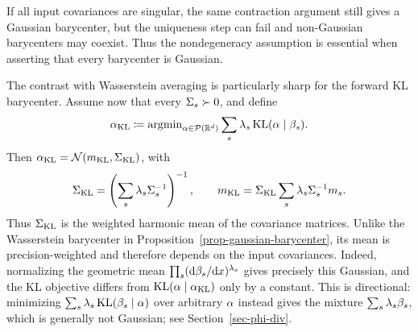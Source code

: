 If all input covariances are singular, the same contraction argument still gives a Gaussian barycenter, but the uniqueness step can fail and non-Gaussian barycenters may coexist. Thus the nondegeneracy assumption is essential when asserting that every barycenter is Gaussian.

\begin{rem}
	The contrast with Wasserstein averaging is particularly sharp for the forward KL barycenter. Assume now that every \(\Sigma_s\succ0\), and define
	\[
		\alpha_{\mathrm{KL}}
		\coloneqq
		\operatorname{argmin}_{\alpha\in\mathcal{P}(\mathbb{R}^d)}
		\sum_s\lambda_s\operatorname{KL}(\alpha\mid\beta_s).
	\]
	Then \(\alpha_{\mathrm{KL}}=\mathcal{N}(m_{\mathrm{KL}},\Sigma_{\mathrm{KL}})\), with
	\[
		\Sigma_{\mathrm{KL}}
		=
		\left(\sum_s\lambda_s\Sigma_s^{-1}\right)^{-1},
		\qquad
		m_{\mathrm{KL}}
		=
		\Sigma_{\mathrm{KL}}
		\sum_s\lambda_s\Sigma_s^{-1}m_s.
	\]
	Thus \(\Sigma_{\mathrm{KL}}\) is the weighted harmonic mean of the covariance matrices. Unlike the Wasserstein barycenter in Proposition~\ref{prop-gaussian-barycenter}, its mean is precision-weighted and therefore depends on the input covariances. Indeed, normalizing the geometric mean \(\prod_s(\mathrm{d}\beta_s/\mathrm{d} x)^{\lambda_s}\) gives precisely this Gaussian, and the KL objective differs from \(\operatorname{KL}(\alpha\mid\alpha_{\mathrm{KL}})\) only by a constant. This is directional: minimizing \(\sum_s\lambda_s\operatorname{KL}(\beta_s\mid\alpha)\) over arbitrary \(\alpha\) instead gives the mixture \(\sum_s\lambda_s\beta_s\), which is generally not Gaussian; see Section~\ref{sec-phi-div}.
\end{rem}

